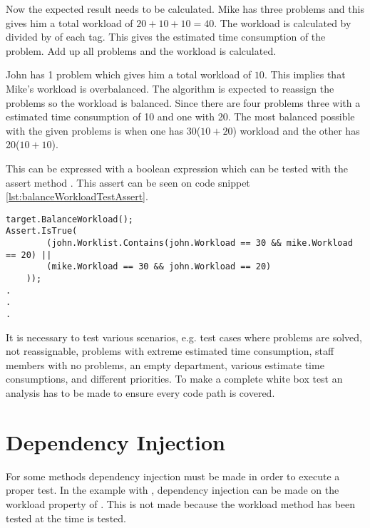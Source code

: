 Now the expected result needs to be calculated. 
Mike has three problems and this gives him a total workload of $20 + 10 + 10 = 40$. The workload is calculated by  divided by  of each tag.
This gives the estimated time consumption of the problem. Add up all problems and the workload is calculated.

John has 1 problem which gives him a total workload of $10$. 
This implies that Mike's workload is overbalanced. 
The algorithm is expected to reassign the problems so the workload is balanced. 
Since there are four problems three with a estimated time consumption of 10 and one with 20.
The most balanced possible with the given problems is when one has 30($10 + 20$) workload and the other has 20($10 + 10$). 

This can be expressed with a boolean expression which can be tested with the assert method . 
This assert can be seen on code snippet \ref{lst:balanceWorkloadTestAssert}.

\begin{lstlisting}[style=sourceCode, caption=\myCaption{An example unit test which tests a specific instance of the balanceWorkload method.}, label=lst:balanceWorkloadTestAssert,name=src:balance]
target.BalanceWorkload();
Assert.IsTrue(
		(john.Worklist.Contains(john.Workload == 30 && mike.Workload == 20) ||
		(mike.Workload == 30 && john.Workload == 20)
	));
.
.
.
\end{lstlisting}

It is necessary to test various scenarios, e.g. test cases where problems are solved, not reassignable, problems with extreme estimated time consumption, staff members with no problems, an empty department, various estimate time consumptions, and different priorities. To make a complete white box test an analysis has to be made to ensure every code path is covered. 

\section{Dependency Injection}
\label{sec:independencyInjection}
For some methods dependency injection must be made in order to execute a proper test. 
In the example with , dependency injection can be made on the workload property of . 
This is not made because the workload method has been tested at the time  is tested.

